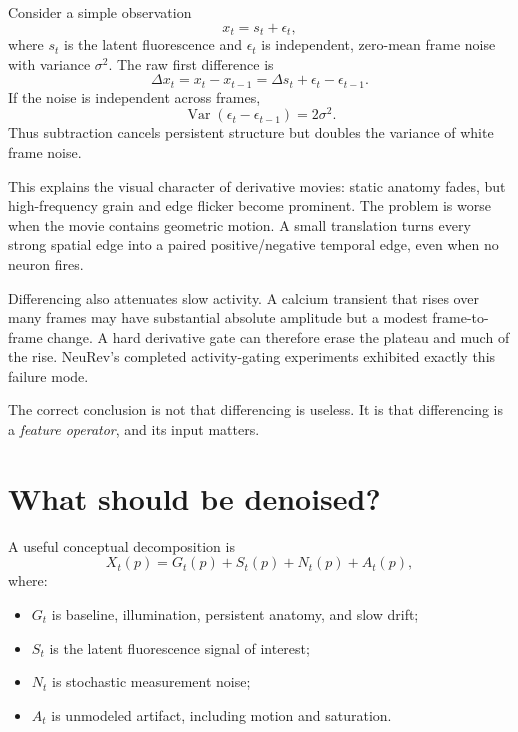 \documentclass[11pt]{article}
\newcommand{\Var}{\operatorname{Var}}
\begin{document}
Consider a simple observation
\begin{equation}
x_t=s_t+\epsilon_t,
\end{equation}
where \(s_t\) is the latent fluorescence and \(\epsilon_t\) is independent,
zero-mean frame noise with variance \(\sigma^2\). The raw first difference is
\begin{equation}
\Delta x_t
=
x_t-x_{t-1}
=
\Delta s_t+\epsilon_t-\epsilon_{t-1}.
\end{equation}
If the noise is independent across frames,
\begin{equation}
\Var(\epsilon_t-\epsilon_{t-1})=2\sigma^2.
\label{eq:noise-doubling}
\end{equation}
Thus subtraction cancels persistent structure but doubles the variance of white
frame noise.

This explains the visual character of derivative movies: static anatomy fades,
but high-frequency grain and edge flicker become prominent. The problem is
worse when the movie contains geometric motion. A small translation turns every
strong spatial edge into a paired positive/negative temporal edge, even when no
neuron fires.

Differencing also attenuates slow activity. A calcium transient that rises over
many frames may have substantial absolute amplitude but a modest frame-to-frame
change. A hard derivative gate can therefore erase the plateau and much of the
rise. NeuRev's completed activity-gating experiments exhibited exactly this
failure mode.

The correct conclusion is not that differencing is useless. It is that
differencing is a \emph{feature operator}, and its input matters.

\section{What should be denoised?}

A useful conceptual decomposition is
\begin{equation}
X_t(p)
=
G_t(p)+S_t(p)+N_t(p)+A_t(p),
\label{eq:decomposition}
\end{equation}
where:
\begin{itemize}[leftmargin=*]
\item \(G_t\) is baseline, illumination, persistent anatomy, and slow drift;
\item \(S_t\) is the latent fluorescence signal of interest;
\item \(N_t\) is stochastic measurement noise;
\item \(A_t\) is unmodeled artifact, including motion and saturation.
\end{itemize}
\end{document}
